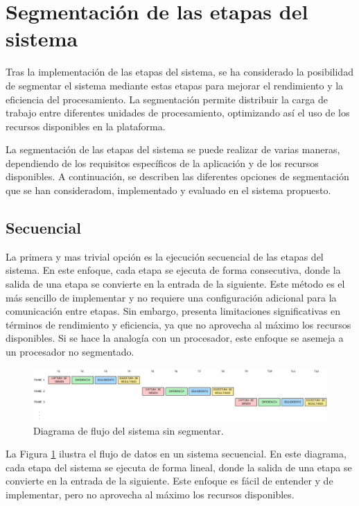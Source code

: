 \documentclass[11pt,spanish,listoffigures,listoftables]{tfgetsinf}
\begin{document}
\section{Segmentación de las etapas del sistema} \label{sec:segmentacion_etapas}

Tras la implementación de las etapas del sistema, se ha considerado la posibilidad de segmentar el sistema mediante estas etapas para mejorar el rendimiento y la eficiencia del procesamiento. La segmentación permite distribuir la carga de trabajo entre diferentes unidades de procesamiento, optimizando así el uso de los recursos disponibles en la plataforma.

La segmentación de las etapas del sistema se puede realizar de varias maneras, dependiendo de los requisitos específicos de la aplicación y de los recursos disponibles. A continuación, se describen las diferentes opciones de segmentación que se han consideradom, implementado y evaluado en el sistema propuesto.
    
\subsection{Secuencial} \label{sub:secuencial}

La primera y mas trivial opción es la ejecución secuencial de las etapas del sistema. En este enfoque, cada etapa se ejecuta de forma consecutiva, donde la salida de una etapa se convierte en la entrada de la siguiente. Este método es el más sencillo de implementar y no requiere una configuración adicional para la comunicación entre etapas. Sin embargo, presenta limitaciones significativas en términos de rendimiento y eficiencia, ya que no aprovecha al máximo los recursos disponibles. Si se hace la analogía con un procesador, este enfoque se asemeja a un procesador no segmentado.

\begin{figure}[H]
   \centering
   \includegraphics[width=1\textwidth]{images/diseno_e_implementacion/secuencial.png}
   \caption[Diagrama de flujo del sistema sin segmentar]{Diagrama de flujo del sistema sin segmentar.}
   \label{fig:secuencial}
\end{figure}

La Figura \ref{fig:secuencial} ilustra el flujo de datos en un sistema secuencial. En este diagrama, cada etapa del sistema se ejecuta de forma lineal, donde la salida de una etapa se convierte en la entrada de la siguiente. Este enfoque es fácil de entender y de implementar, pero no aprovecha al máximo los recursos disponibles.
\end{document}
